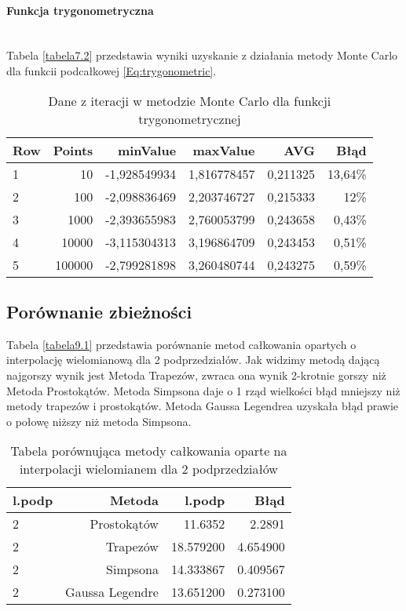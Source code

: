 \documentclass[12pt,twoside]{article}
\begin{document}
\paragraph{Funkcja trygonometryczna}\mbox{} \\

Tabela \eqref{tabela7.2} przedstawia wyniki uzyskanie z działania metody Monte Carlo dla funkcii podcałkowej \eqref{Eq:trygonometric}.

\begin{table}[H]
\centering 
\caption{Dane z iteracji w metodzie Monte Carlo dla funkcji trygonometrycznej}
\label{tabela7.2}
\begin{tabular}{lrrrrr}
\toprule
{Row} &  Points &  minValue &  maxValue &       AVG &      Błąd \\
\midrule
1  &     10 & -1,928549934 &   1,816778457 & 0,211325 & 13,64\% \\
2  &     100 & -2,098836469 &  2,203746727 & 0,215333 & 12\% \\
3  &     1000 & -2,393655983 &   2,760053799 & 0,243658 & 0,43\% \\
4  &     10000 & -3,115304313 &  3,196864709 & 0,243453 & 0,51\% \\
5  &     100000 & -2,799281898 &  3,260480744 & 0,243275 & 0,59\% \\
\bottomrule
\end{tabular}
\end{table}

\subsection{Porównanie zbieżności}

Tabela \eqref{tabela9.1} przedstawia porównanie metod całkowania opartych o interpolację wielomianową dla 2 podprzedziałów.
Jak widzimy metodą dającą najgorszy wynik jest Metoda Trapezów, zwraca ona wynik 2-krotnie gorszy niż Metoda Prostokątów. 
Metoda Simpsona daje o 1 rząd wielkości błąd mniejszy niż metody trapezów i prostokątów. 
Metoda Gaussa Legendrea uzyskała błąd prawie o połowę niższy niż metoda Simpsona.

\begin{table}
\centering 
\caption{Tabela porównująca metody całkowania oparte na interpolacji wielomianem dla 2 podprzedziałów }
\label{tabela9.1}
\begin{tabular}{lrrr}
\toprule
{l.podp} & Metoda &  l.podp &  Błąd \\
\midrule
2  &     Prostokątów & 11.6352 &   2.2891  \\
2  &     Trapezów & 18.579200 &  4.654900  \\
2  &     Simpsona & 14.333867 &   0.409567  \\
2  &     Gaussa Legendre & 13.651200 &  0.273100  \\
\bottomrule
\end{tabular}
\end{table}
\end{document}
